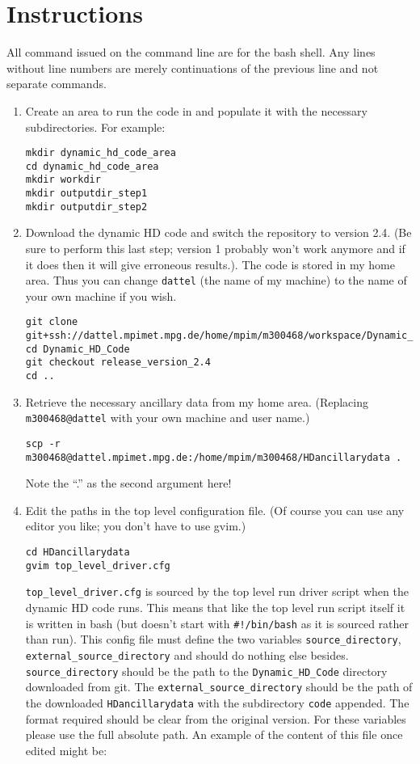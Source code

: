 \documentclass{article}
\begin{document}
\section{Instructions}
All command issued on the command line are for the bash shell. Any lines without line numbers are merely continuations of the previous line and not separate commands.
\begin{enumerate}
\item Create an area to run the code in and populate it with the necessary subdirectories. For example:
\begin{lstlisting}[style=bash_input]
mkdir dynamic_hd_code_area
cd dynamic_hd_code_area
mkdir workdir
mkdir outputdir_step1
mkdir outputdir_step2
\end{lstlisting}
\item Download the dynamic HD code and switch the repository to version 2.4. (Be sure to perform this last step; version 1 probably won't work anymore and if it does then it will give erroneous results.). The code is stored in my home area. Thus you can change  \lstinline[style=bash_input]{dattel} (the name of my machine) to the name of your own machine if you wish.
\begin{lstlisting}[style=bash_input,breaklines=true]
git clone git+ssh://dattel.mpimet.mpg.de/home/mpim/m300468/workspace/Dynamic_HD_Code
cd Dynamic_HD_Code
git checkout release_version_2.4
cd ..
\end{lstlisting}
\item Retrieve the necessary ancillary data from my home area. (Replacing \lstinline[style=bash_input]{m300468@dattel} with your own machine and user name.)
\begin{lstlisting}[style=bash_input,breaklines=true]
scp -r m300468@dattel.mpimet.mpg.de:/home/mpim/m300468/HDancillarydata .
\end{lstlisting}
Note the ``.'' as the second argument here!
\item Edit the paths in the top level configuration file. (Of course you can use any editor you like; you don't have to use gvim.)
\begin{lstlisting}[style=bash_input]
cd HDancillarydata
gvim top_level_driver.cfg
\end{lstlisting}
\lstinline[style=bash_input]{top_level_driver.cfg} is sourced by the top level run driver script when the dynamic HD code runs. This means that like the top level run script itself it is written in bash (but doesn't start with \lstinline[style=bash_input]{#!/bin/bash} as it is sourced rather than run). This config file must define the two variables \lstinline[style=bash_input]{source_directory}, \lstinline[style=bash_input]{external_source_directory} and should do nothing else besides. \lstinline[style=bash_input]{source_directory} should be the path to the \lstinline[style=bash_input]{Dynamic_HD_Code} directory downloaded from git. The \lstinline[style=bash_input]{external_source_directory} should be the path of the downloaded \lstinline[style=bash_input]{HDancillarydata} with the subdirectory \lstinline[style=bash_input]{code} appended. The format required should be clear from the original version. For these variables please use the full absolute path. An example of the content of this file once edited might be:

\end{enumerate}
\end{document}
